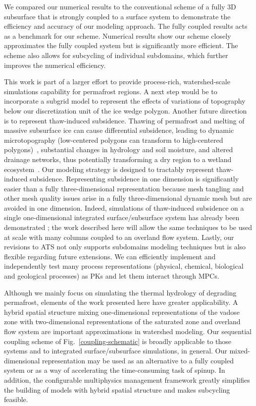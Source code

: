 \documentclass[review]{elsarticle}
\begin{document}
We compared our numerical results to the conventional scheme of a fully 3D subsurface that is strongly coupled to a surface system to demonstrate the efficiency and accuracy of our modeling approach. The fully coupled results acts as a benchmark for our scheme. Numerical results show our scheme closely approximates the fully coupled system but is significantly more efficient. The scheme also allows for subcycling of individual subdomains, which further improves the numerical efficiency. 

This work is part of a larger effort to provide process-rich, watershed-scale simulations capability for permafrost regions.  A next step would be to incorporate a subgrid model to represent the effects of  variations of topography below our discretization unit of the ice wedge polygon. Another future direction is to represent thaw-induced subsidence. Thawing of permafrost and melting of massive subsurface ice can cause differential subsidence, leading to dynamic microtopography (low-centered polygons can transform to high-centered polygons)~\cite{jorgenson2006abrupt,liljedahl2012ice}, substantial changes in hydrology and soil moisture, and altered drainage networks, thus potentially transforming a dry region to a wetland ecosystem~\cite{hinzman2005evidence,rowland2010arctic}. Our modeling strategy is designed to tractably represent  thaw-induced subsidence. Representing subsidence in one dimension is significantly easier than a fully three-dimensional representation because mesh tangling and other mesh quality issues arise in a fully three-dimensional dynamic mesh but are avoided in one dimension. Indeed, simulations of thaw-induced subsidence on a single one-dimensional integrated surface/subsurface system has already been demonstrated \cite{painter2013modeling}; the work described here will allow the same techniques to be used at scale with many columns coupled to an overland flow system. Lastly, our  revisions to ATS not only supports subdomains modeling techniques but is also flexible regarding future extensions. We can efficiently implement and independently test many process representations (physical, chemical, biological and geological processes) as PKs and let them interact through MPCs. 
 
Although we mainly focus on simulating the thermal hydrology of degrading permafrost, elements of the work presented here have greater applicability. A hybrid spatial structure mixing one-dimensional representations of the vadose zone with two-dimensional representations of the saturated zone and overland flow system are important approximations in watershed modeling.  Our sequential coupling scheme of Fig.~\ref{coupling-schematic} is broadly applicable to those systems and to integrated surface/subsurface simulations, in general. Our mixed-dimensional representation may be used as an alternative to a fully coupled system or as a way of accelerating the time-consuming task of spinup. In addition, the configurable multiphysics management framework greatly simplifies the building of models with hybrid spatial structure and makes subcycling feasible. 
\end{document}
